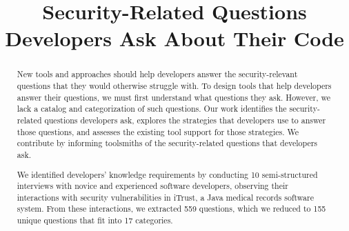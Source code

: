 \documentclass[conference]{IEEEtran}
\begin{document}
%
\title{Security-Related Questions Developers Ask About Their Code}


\author{
}



\maketitle

\begin{abstract}

New tools and approaches should help developers answer the security-relevant questions that they would otherwise struggle with. 
To design tools that help developers answer their questions, we must first understand what questions they ask.
However, we lack a catalog and categorization of such questions. 
Our work identifies the security-related questions developers ask, explores the strategies that developers use to answer those questions, and assesses the existing tool support for those strategies.  
We contribute by informing toolsmiths of the security-related questions that developers ask.

We identified developers' knowledge requirements by conducting 10 semi-structured interviews with novice and experienced software developers, observing their interactions with security vulnerabilities in iTrust, a Java medical records software system.
From these interactions, we extracted 559 questions, which we reduced to 155 unique questions that fit into 17 categories.


\end{abstract}

%
\IEEEpeerreviewmaketitle
\end{document}
